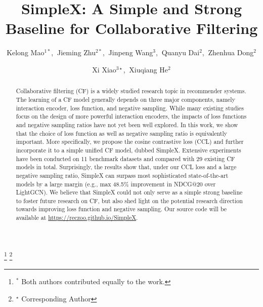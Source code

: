 \documentclass[sigconf,authorversion]{acmart}
\begin{document}
\fancyhead{}
\title{SimpleX: A Simple and Strong Baseline for Collaborative Filtering}

\author{Kelong Mao$^{1\ast}$,$\:$ Jieming Zhu$^{2\ast}$,$\:$  Jinpeng Wang$^3$,$\:$  Quanyu Dai$^2$,$\:$  Zhenhua Dong$^2$}
\author{Xi Xiao$^{3\star}$,$\:$  Xiuqiang He$^2$}
\thanks{$^\ast$ Both authors contributed equally to the work.}
\thanks{$^\star$ Corresponding Author}



\renewcommand{\authors}{Kelong Mao, Jieming Zhu, Jinpeng Wang, Quanyu Dai, Zhenhua Dong, Xi Xiao, Xiuqiang He}
















\begin{abstract}
Collaborative filtering (CF) is a widely studied research topic in recommender systems. The learning of a CF model generally depends on three major components, namely interaction encoder, loss function, and negative sampling. While many existing studies focus on the design of more powerful interaction encoders, the impacts of loss functions and negative sampling ratios have not yet been well explored. In this work, we show that the choice of loss function as well as negative sampling ratio is equivalently important. More specifically, we propose the {cosine contrastive loss} (CCL) and further incorporate it to a simple unified CF model, dubbed SimpleX. Extensive experiments have been conducted on 11 benchmark datasets and compared with 29 existing CF models in total. Surprisingly, the results show that, under our CCL loss and a large negative sampling ratio, SimpleX can surpass most sophisticated state-of-the-art models by a large margin (e.g., max 48.5\% improvement in NDCG@20 over LightGCN). We believe that SimpleX could not only serve as a simple strong baseline to foster future research on CF, but also shed light on the potential research direction towards improving loss function and negative sampling. Our source code will be available at \textcolor{magenta}{\url{https://reczoo.github.io/SimpleX}}.
\end{abstract}
\end{document}
